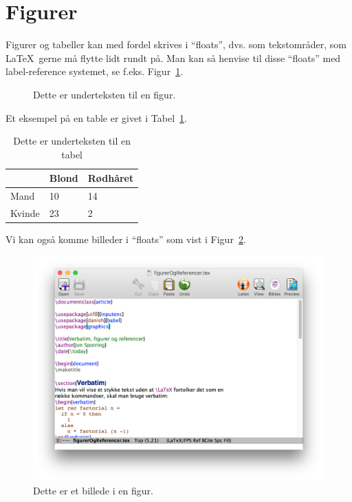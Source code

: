 \documentclass{article}
\begin{document}
\section{Figurer}
Figurer og tabeller kan med fordel skrives i "`floats"', dvs. som
tekstområder, som \LaTeX\ gerne må flytte lidt rundt på. Man kan så
henvise til disse "`floats"' med label-reference systemet, se
f.eks. Figur~\ref{fig:minFigur}.
\begin{figure}
  \centering
  \caption{Dette er underteksten til en figur.}
  \label{fig:minFigur}
\end{figure}
Et eksempel på en table er givet i Tabel~\ref{tab:minTabel}.
\begin{table}
  \centering
  \begin{tabular}{|l|l|l|}
    \hline
    & Blond & Rødhåret \\
    \hline
    Mand & 10 & 14\\
    Kvinde & 23 & 2 \\
    \hline
  \end{tabular}
  \caption{Dette er underteksten til en tabel}
  \label{tab:minTabel}
\end{table}
Vi kan også komme billeder i "`floats"' som vist i Figur~\ref{fig:billede}.
\begin{figure}
  \centering
  \includegraphics[width=0.6\linewidth]{emacs.png}
  \caption{Dette er et billede i en figur.}
  \label{fig:billede}
\end{figure}
\end{document}
